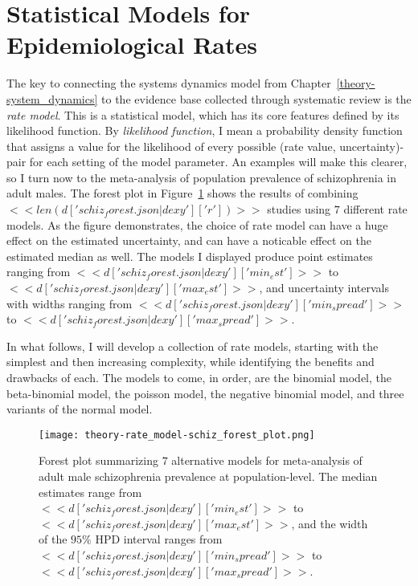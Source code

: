 \section{Statistical Models for Epidemiological Rates}
\label{theory-rate_model}

The key to connecting the systems dynamics model from
Chapter~\ref{theory-system_dynamics} to the evidence base collected
through systematic review is the \emph{rate model}.  This is a
statistical model, which has its core features defined by its
likelihood function.  By \emph{likelihood function}, I mean a
probability density function that assigns a value for the likelihood
of every possible (rate value, uncertainty)-pair for each setting of
the model parameter.  An examples will make this clearer, so I turn
now to the meta-analysis of population prevalence of schizophrenia in
adult males.  The forest plot in
Figure~\ref{fig:theory-rate_model-schiz_forest} shows the results of
combining $<<len(d['schiz_forest.json|dexy']['r'])>>$ studies using
$7$ different rate models.  As the figure demonstrates, the choice of
rate model can have a huge effect on the estimated uncertainty, and
can have a noticable effect on the estimated median as well. The
models I displayed produce point estimates ranging from
$<<d['schiz_forest.json|dexy']['min_est']>>$ to
$<<d['schiz_forest.json|dexy']['max_est']>>$, and uncertainty
intervals with widths ranging from
$<<d['schiz_forest.json|dexy']['min_spread']>>$ to
$<<d['schiz_forest.json|dexy']['max_spread']>>$.

In what follows, I will develop a collection of rate models, starting
with the simplest and then increasing complexity, while identifying
the benefits and drawbacks of each.  The models to come, in order, are
the binomial model, the beta-binomial model, the poisson model, the
negative binomial model, and three variants of the normal
model.

\begin{figure}
\begin{center}
\texttt{[image: theory-rate\_model-schiz\_forest\_plot.png]}
\end{center}
\caption{Forest plot summarizing $7$ alternative models for
  meta-analysis of adult male schizophrenia prevalence at
  population-level.  The median estimates range from
  $<<d['schiz_forest.json|dexy']['min_est']>>$ to
  $<<d['schiz_forest.json|dexy']['max_est']>>$, and the width of the
  $95\%$ HPD interval ranges from
  $<<d['schiz_forest.json|dexy']['min_spread']>>$ to
  $<<d['schiz_forest.json|dexy']['max_spread']>>$.}
\label{fig:theory-rate_model-schiz_forest}
\end{figure}

